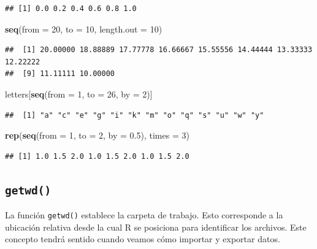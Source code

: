 \documentclass[
]{book}
\newenvironment{Shaded}{\begin{snugshade}}{\end{snugshade}}
\newcommand{\DataTypeTok}[1]{\textcolor[rgb]{0.13,0.29,0.53}{#1}}
\newcommand{\DecValTok}[1]{\textcolor[rgb]{0.00,0.00,0.81}{#1}}
\newcommand{\FloatTok}[1]{\textcolor[rgb]{0.00,0.00,0.81}{#1}}
\newcommand{\KeywordTok}[1]{\textcolor[rgb]{0.13,0.29,0.53}{\textbf{#1}}}
\newcommand{\NormalTok}[1]{#1}
\begin{document}
\begin{verbatim}
## [1] 0.0 0.2 0.4 0.6 0.8 1.0
\end{verbatim}

\begin{Shaded}
\begin{Highlighting}[]
\KeywordTok{seq}\NormalTok{(}\DataTypeTok{from =} \DecValTok{20}\NormalTok{, }\DataTypeTok{to =} \DecValTok{10}\NormalTok{, }\DataTypeTok{length.out =} \DecValTok{10}\NormalTok{)}
\end{Highlighting}
\end{Shaded}

\begin{verbatim}
##  [1] 20.00000 18.88889 17.77778 16.66667 15.55556 14.44444 13.33333 12.22222
##  [9] 11.11111 10.00000
\end{verbatim}

\begin{Shaded}
\begin{Highlighting}[]
\NormalTok{letters[}\KeywordTok{seq}\NormalTok{(}\DataTypeTok{from =} \DecValTok{1}\NormalTok{, }\DataTypeTok{to =} \DecValTok{26}\NormalTok{, }\DataTypeTok{by =} \DecValTok{2}\NormalTok{)]}
\end{Highlighting}
\end{Shaded}

\begin{verbatim}
##  [1] "a" "c" "e" "g" "i" "k" "m" "o" "q" "s" "u" "w" "y"
\end{verbatim}

\begin{Shaded}
\begin{Highlighting}[]
\KeywordTok{rep}\NormalTok{(}\KeywordTok{seq}\NormalTok{(}\DataTypeTok{from =} \DecValTok{1}\NormalTok{, }\DataTypeTok{to =} \DecValTok{2}\NormalTok{, }\DataTypeTok{by =} \FloatTok{0.5}\NormalTok{), }\DataTypeTok{times =} \DecValTok{3}\NormalTok{)}
\end{Highlighting}
\end{Shaded}

\begin{verbatim}
## [1] 1.0 1.5 2.0 1.0 1.5 2.0 1.0 1.5 2.0
\end{verbatim}

\hypertarget{l015getwd}{%
\subsection{\texorpdfstring{\texttt{getwd()}}{getwd()}}\label{l015getwd}}

La función \texttt{getwd()} establece la carpeta de trabajo. Esto corresponde a la ubicación relativa desde la cual R se posiciona para identificar los archivos. Este concepto tendrá sentido cuando veamos cómo importar y exportar datos.
\end{document}
